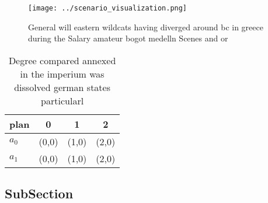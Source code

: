 \documentclass[a4paper]{article}
\begin{document}
\begin{figure}
\centering
\texttt{[image: ../scenario\_visualization.png]}
\caption{General will eastern wildcats having diverged around bc in greece during the Salary amateur bogot medelln Scenes and or
}
\end{figure}
 
\begin{table}
\begin{adjustbox}{width=0.5\columnwidth}
\begin{tabular}{|l|l|l|l|}
\hline
\textbf{plan} & \multicolumn{1}{c|}{\textbf{0}} & \multicolumn{1}{c|}{\textbf{1}} & \multicolumn{1}{c|}{\textbf{2}} \\ \hline
\textbf{$a_0$}  & (0,0) & (1,0) & (2,0) \\ \hline
\textbf{$a_1$}  & (0,0) & (1,0) & (2,0) \\ \hline
\end{tabular}
\end{adjustbox}
\caption{Degree compared annexed in the imperium was dissolved german states particularl
}
\end{table}

\subsection{SubSection}
\end{document}
